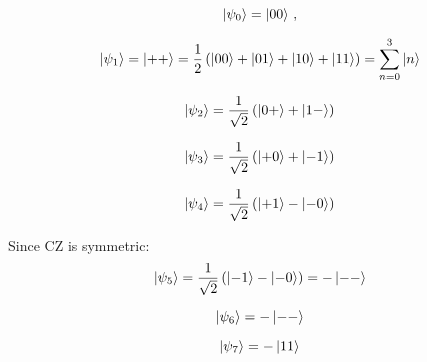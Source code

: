 
\begin{figure}[h]
    \centering

\end{figure}

\begin{equation}
    \ket{\psi_0} = \ket{00}  \, ,
\end{equation}

\begin{equation}
        \ket{\psi_1} = \ket{++} = \frac{1}{2} \left( \ket{00} + \ket{01} + \ket{10} + \ket{11} \right) = \sum_{n=0}^{3} \ket{n}
\end{equation}


\begin{equation}
        \ket{\psi_2} = \frac{1}{\sqrt{2}} \left( \ket{0+} + \ket{1-}\right)
\end{equation}

\begin{equation}
        \ket{\psi_3} = \frac{1}{\sqrt{2}} \left( \ket{+0} + \ket{-1} \right)
\end{equation}

\begin{equation}
        \ket{\psi_4} = \frac{1}{\sqrt{2}} \left( \ket{+1} - \ket{-0} \right) 
\end{equation}

Since CZ is symmetric:
\begin{equation}
        \ket{\psi_5} =  \frac{1}{\sqrt{2}} \left( \ket{-1} - \ket{-0} \right) =  - \ket{--}
\end{equation}

\begin{equation}
        \ket{\psi_6} = - \ket{--}
\end{equation}

\begin{equation}
        \ket{\psi_7} = - \ket{11}   
\end{equation}

